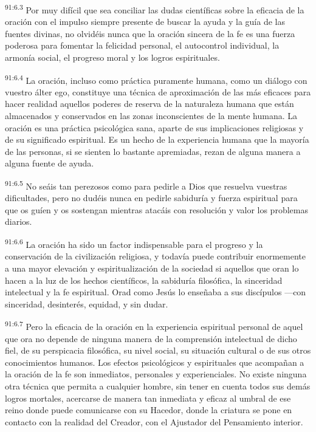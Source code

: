 \documentclass[twoside, 11pt]{book}
\begin{document}
\par
\textsuperscript{91:6.3} Por muy difícil que sea conciliar las dudas científicas sobre la eficacia de la oración con el impulso siempre presente de buscar la ayuda y la guía de las fuentes divinas, no olvidéis nunca que la oración sincera de la fe es una fuerza poderosa para fomentar la felicidad personal, el autocontrol individual, la armonía social, el progreso moral y los logros espirituales.

\par
\textsuperscript{91:6.4} La oración, incluso como práctica puramente humana, como un diálogo con vuestro álter ego, constituye una técnica de aproximación de las más eficaces para hacer realidad aquellos poderes de reserva de la naturaleza humana que están almacenados y conservados en las zonas inconscientes de la mente humana. La oración es una práctica psicológica sana, aparte de sus implicaciones religiosas y de su significado espiritual. Es un hecho de la experiencia humana que la mayoría de las personas, si se sienten lo bastante apremiadas, rezan de alguna manera a alguna fuente de ayuda.

\par
\textsuperscript{91:6.5} No seáis tan perezosos como para pedirle a Dios que resuelva vuestras dificultades, pero no dudéis nunca en pedirle sabiduría y fuerza espiritual para que os guíen y os sostengan mientras atacáis con resolución y valor los problemas diarios.

\par
\textsuperscript{91:6.6} La oración ha sido un factor indispensable para el progreso y la conservación de la civilización religiosa, y todavía puede contribuir enormemente a una mayor elevación y espiritualización de la sociedad si aquellos que oran lo hacen a la luz de los hechos científicos, la sabiduría filosófica, la sinceridad intelectual y la fe espiritual. Orad como Jesús lo enseñaba a sus discípulos ---con sinceridad, desinterés, equidad, y sin dudar.

\par
\textsuperscript{91:6.7} Pero la eficacia de la oración en la experiencia espiritual personal de aquel que ora no depende de ninguna manera de la comprensión intelectual de dicho fiel, de su perspicacia filosófica, su nivel social, su situación cultural o de sus otros conocimientos humanos. Los efectos psicológicos y espirituales que acompañan a la oración de la fe son inmediatos, personales y experienciales. No existe ninguna otra técnica que permita a cualquier hombre, sin tener en cuenta todos sus demás logros mortales, acercarse de manera tan inmediata y eficaz al umbral de ese reino donde puede comunicarse con su Hacedor, donde la criatura se pone en contacto con la realidad del Creador, con el Ajustador del Pensamiento interior.
\end{document}
